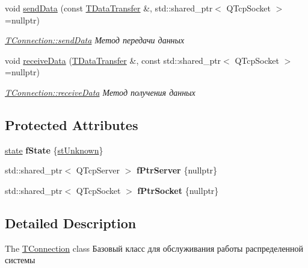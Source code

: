 \begin{DoxyCompactItemize}
void \hyperlink{classconnection_1_1_t_connection_a33820a3f5bdd262104599df7174e229d}{send\+Data} (const \hyperlink{structconnection_1_1_t_data_transfer}{T\+Data\+Transfer} \&, std\+::shared\+\_\+ptr$<$ Q\+Tcp\+Socket $>$=nullptr)
\begin{DoxyCompactList}\small\item\em \hyperlink{classconnection_1_1_t_connection_acf6af6c583b67379f8aa1efb4ab9e79e}{T\+Connection\+::send\+Data} Метод передачи данных \end{DoxyCompactList}\item 
void \hyperlink{classconnection_1_1_t_connection_aa55500363892831d9764496cd63cec73}{receive\+Data} (\hyperlink{structconnection_1_1_t_data_transfer}{T\+Data\+Transfer} \&, const std\+::shared\+\_\+ptr$<$ Q\+Tcp\+Socket $>$=nullptr)
\begin{DoxyCompactList}\small\item\em \hyperlink{classconnection_1_1_t_connection_aa55500363892831d9764496cd63cec73}{T\+Connection\+::receive\+Data} Метод получения данных \end{DoxyCompactList}\end{DoxyCompactItemize}
\subsection*{Protected Attributes}
\begin{DoxyCompactItemize}
\item 
\mbox{\label{classconnection_1_1_t_connection_aa55714bb2a9a2b9330b2fd81f7a47f17}} 
\hyperlink{classconnection_1_1_t_connection_aee7dfb7510592bd2697ab6f906b9612c}{state} {\bfseries f\+State} \{\hyperlink{classconnection_1_1_t_connection_aee7dfb7510592bd2697ab6f906b9612ca8ab66af10a4d089e45c493a28df001e4}{st\+Unknown}\}
\item 
\mbox{\label{classconnection_1_1_t_connection_aef0ac752e1f8b50fe31a01aff7ee802a}} 
std\+::shared\+\_\+ptr$<$ Q\+Tcp\+Server $>$ {\bfseries f\+Ptr\+Server} \{nullptr\}
\item 
\mbox{\label{classconnection_1_1_t_connection_a84981e0f089de2f0a0d2496f43fa09ac}} 
std\+::shared\+\_\+ptr$<$ Q\+Tcp\+Socket $>$ {\bfseries f\+Ptr\+Socket} \{nullptr\}
\end{DoxyCompactItemize}


\subsection{Detailed Description}
The \hyperlink{classconnection_1_1_t_connection}{T\+Connection} class Базовый класс для обслуживания работы распределенной системы 

